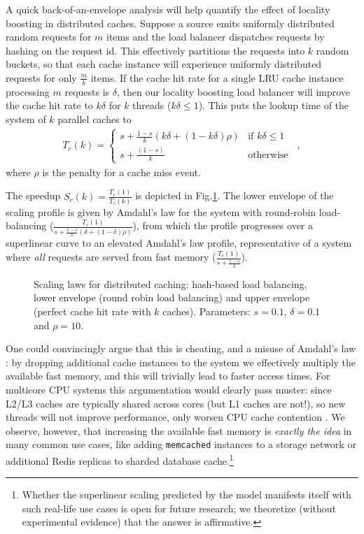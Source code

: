 \documentclass[letterpaper,twocolumn,10pt]{article}
\begin{document}
A quick back-of-an-envelope analysis will help quantify the effect of locality boosting in distributed caches. Suppose a source emits uniformly distributed random requests for $m$ items and the load balancer dispatches requests by hashing on the request id. This effectively partitions the requests into $k$ random buckets, so that each cache instance will experience uniformly distributed requests for only $\frac{m}{k}$ items. If the cache hit rate for a single LRU cache instance processing $m$ requests is $\delta$, then our locality boosting load balancer will improve the cache hit rate to $k\delta$ for $k$ threads ($k\delta \le 1$). This puts the lookup time of the system of $k$ parallel caches to
\begin{align}\label{eq:dist-cache}
  T_c(k) = \begin{cases} s + \frac{1-s}{k}(k\delta + (1-k\delta)\rho) & \text{if } k\delta \le 1\\s + \frac{(1-s)}{k} & \text{otherwise}\end{cases} \enspace ,
\end{align}
where $\rho$ is the penalty for a cache miss event.

The speedup $S_c(k)=\frac{T_c(1)}{T_c(k)}$ is depicted in Fig.\ref{fig:dcache-analysis}. The lower envelope of the scaling profile is given by Amdahl's law for the system with round-robin load-balancing ($\frac{T_c(1)}{s + \frac{1-s}{k}(\delta + (1-\delta)\rho)}$), from which the profile progresses over a superlinear curve to an elevated Amdahl's law profile, representative of a system where \emph{all} requests are served from fast memory ($\frac{T_c(1)}{s + \frac{1-s}{k}}$).

\begin{figure}[t]
  \centering
  \begin{small}
    
\end{small}
\caption{Scaling laws for distributed caching: hash-based load balancing, lower envelope (round robin load balancing) and upper envelope (perfect cache hit rate with $k$ caches). Parameters: $s=0.1$, $\delta=0.1$ and $\rho=10$.}
  \label{fig:dcache-analysis}
\end{figure}

One could convincingly argue that this is cheating, and a misuse of Amdahl's law \cite{10.5555/775339.775386}: by dropping additional cache instances to the system we effectively multiply the available fast memory, and this will trivially lead to faster access times. For multicore CPU systems this argumentation would clearly pass muster: since L2/L3 caches are typically shared across cores (but L1 caches are not!), so new threads will not improve performance, only worsen CPU cache contention \cite{manousis-sigcomm20, 211291}. We observe, however, that increasing the available fast memory is \emph{exactly the idea} in many common use cases, like adding \texttt{memcached} instances to a storage network or additional Redis replicas to sharded database cache.\footnote{Whether the superlinear scaling predicted by the model manifests itself with such real-life use cases is open for future research; we theoretize (without experimental evidence) that the answer is affirmative.}
\end{document}
